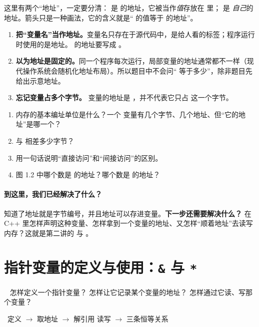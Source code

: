 这里有两个“地址”，一定要分清： 是  的地址，它被当作\emph{值}存放在  里； 是  \emph{自己}的地址。箭头只是一种画法，它的含义就是“ 的值等于  的地址”。

\begin{warningbox}
\begin{enumerate}
  \item \textbf{把“变量名”当作地址。}变量名只存在于源代码中，是给人看的标签；程序运行时使用的是地址。 的地址要写成 。
  \item \textbf{以为地址是固定的。}同一个程序每次运行，局部变量的地址通常都不一样（现代操作系统会随机化地址布局）。所以题目中不会问“ 等于多少”，除非题目先给出示意地址。
  \item \textbf{忘记变量占多个字节。} 变量的地址是 ，并不代表它只占  这一个字节。
\end{enumerate}
\end{warningbox}

\begin{checkbox}
\begin{enumerate}[label=\arabic*.,itemsep=0pt]
  \item 内存的基本编址单位是什么？一个  变量有几个字节、几个地址、但“它的地址”是哪一个？
  \item {} 与  相差多少字节？
  \item 用一句话说明“直接访问”和“间接访问”的区别。
  \item 图 1.2 中哪个数是  的地址？哪个数是  的地址？
\end{enumerate}
\end{checkbox}

\paragraph{到这里，我们已经解决了什么？} 知道了地址就是字节编号，并且地址可以存进变量。\textbf{下一步还需要解决什么？} 在 C++ 里怎样声明这种变量、怎样拿到一个变量的地址、又怎样“顺着地址”去读写内存？这就是第二讲的 \cc{\&} 与 \cc{*}。

\section{\texorpdfstring{指针变量的定义与使用：\texttt{\&} 与 \texttt{*}}{指针变量的定义与使用：& 与 *}}\label{sec:def}
\  怎样定义一个指针变量？ 怎样让它记录某个变量的地址？ 怎样通过它读、写那个变量？\par
{}\ 定义  $\to$ 取地址  $\to$ 解引用  读写 $\to$ 三条恒等关系

